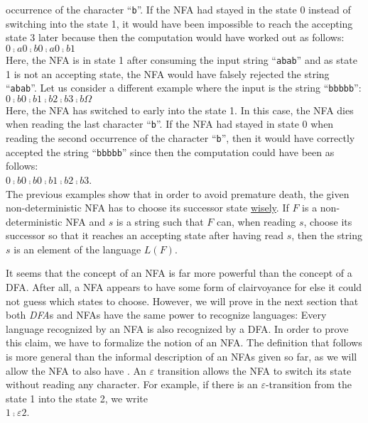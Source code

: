 occurrence of the character ``\texttt{b}''.  If the \textsc{NFA} had stayed in the state $0$ instead
of switching into the state 1, it would have been impossible to reach the accepting state 3 later
because then the computation would have worked out as follows:
\\[0.2cm]
\hspace*{1.3cm}
$0 \comp{a} 0 \comp{b} 0 \comp{a} 0 \comp{b} 1$
\\[0.2cm] 
Here, the \textsc{NFA} is in state 1 after consuming the input string ``\texttt{abab}'' and as state
1 is not an accepting state, the \textsc{NFA} would have falsely rejected the string ``\texttt{abab}''.
Let us consider a different example where the input is the string ``\texttt{bbbbb}'':
\\[0.2cm]
\hspace*{1.3cm}
$0 \comp{b} 0 \comp{b} 1 \comp{b} 2 \comp{b} 3 \comp{b} \Omega$
\\[0.2cm]
Here, the \textsc{NFA} has switched to early into the state 1.  In this case, the \textsc{NFA} dies
when reading the last character ``\texttt{b}''.  If the \textsc{NFA} had stayed in state $0$ when reading the second
occurrence of the character ``\texttt{b}'', then it would have correctly accepted the string
``\texttt{bbbbb}'' since then the computation could have been as follows:
\\[0.2cm]
\hspace*{1.3cm}
$0 \comp{b} 0 \comp{b} 0 \comp{b} 1 \comp{b} 2 \comp{b} 3$.
\\[0.2cm]
The previous examples show that in order to avoid premature death, the given non-deterministic \textsc{NFA} has
to choose its successor state
\href{https://www.youtube.com/watch?v=c3RN9zz77Cs}{wisely}.  
If $F$ is a non-deterministic \textsc{NFA} and $s$ is a string such that $F$ can, when reading $s$,
choose its successor so that it reaches an accepting state after having read $s$, then the string
$s$ is an element of the language $L(F)$.

It seems that the concept of an \textsc{NFA} is far more powerful than the 
concept of a \textsc{DFA}.  After all, a \textsc{NFA} appears to have some form of clairvoyance for else it
could not guess which states to choose.  However, we will prove in the 
next section that both \textsl{DFA}s and \textsc{NFA}s have the same power to
recognize languages:  Every language recognized by an \textsc{NFA} is also
recognized by a \textsc{DFA}.  In order to prove this claim, we have to
formalize the notion of an \textsc{NFA}.  The definition that follows is more
general than the informal description of an \textsc{NFA}s given so far, as we will
allow the \textsc{NFA} to also have .  An $\varepsilon$ transition
allows the \textsc{NFA} to switch its state without reading any character.  For example, if there is
an $\varepsilon$-transition from the state 1 into the state 2, we write
\\[0.2cm]
\hspace*{1.3cm}
$1 \comp{\varepsilon} 2$.


